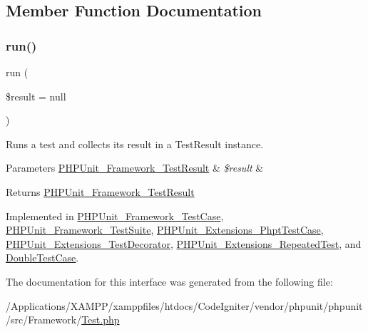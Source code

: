 \subsection{Member Function Documentation}
\mbox{\label{interface_p_h_p_unit___framework___test_aba2e5a83092b40735a7a61c572cd6256}} 
\subsubsection{\texorpdfstring{run()}{run()}}
{\footnotesize\ttfamily run (\begin{DoxyParamCaption}\item[{\mbox{\hyperlink{class_p_h_p_unit___framework___test_result}{P\+H\+P\+Unit\+\_\+\+Framework\+\_\+\+Test\+Result}}}]{\$result = {\ttfamily null} }\end{DoxyParamCaption})}

Runs a test and collects its result in a Test\+Result instance.


\begin{DoxyParams}[1]{Parameters}
\mbox{\hyperlink{class_p_h_p_unit___framework___test_result}{P\+H\+P\+Unit\+\_\+\+Framework\+\_\+\+Test\+Result}} & {\em \$result} & \\
\hline
\end{DoxyParams}
\begin{DoxyReturn}{Returns}
\mbox{\hyperlink{class_p_h_p_unit___framework___test_result}{P\+H\+P\+Unit\+\_\+\+Framework\+\_\+\+Test\+Result}} 
\end{DoxyReturn}


Implemented in \mbox{\hyperlink{class_p_h_p_unit___framework___test_case_aba2e5a83092b40735a7a61c572cd6256}{P\+H\+P\+Unit\+\_\+\+Framework\+\_\+\+Test\+Case}}, \mbox{\hyperlink{class_p_h_p_unit___framework___test_suite_aba2e5a83092b40735a7a61c572cd6256}{P\+H\+P\+Unit\+\_\+\+Framework\+\_\+\+Test\+Suite}}, \mbox{\hyperlink{class_p_h_p_unit___extensions___phpt_test_case_aba2e5a83092b40735a7a61c572cd6256}{P\+H\+P\+Unit\+\_\+\+Extensions\+\_\+\+Phpt\+Test\+Case}}, \mbox{\hyperlink{class_p_h_p_unit___extensions___test_decorator_aba2e5a83092b40735a7a61c572cd6256}{P\+H\+P\+Unit\+\_\+\+Extensions\+\_\+\+Test\+Decorator}}, \mbox{\hyperlink{class_p_h_p_unit___extensions___repeated_test_aba2e5a83092b40735a7a61c572cd6256}{P\+H\+P\+Unit\+\_\+\+Extensions\+\_\+\+Repeated\+Test}}, and \mbox{\hyperlink{class_double_test_case_aba2e5a83092b40735a7a61c572cd6256}{Double\+Test\+Case}}.



The documentation for this interface was generated from the following file\+:\begin{DoxyCompactItemize}
\item 
/\+Applications/\+X\+A\+M\+P\+P/xamppfiles/htdocs/\+Code\+Igniter/vendor/phpunit/phpunit/src/\+Framework/\mbox{\hyperlink{_framework_2_test_8php}{Test.\+php}}\end{DoxyCompactItemize}
